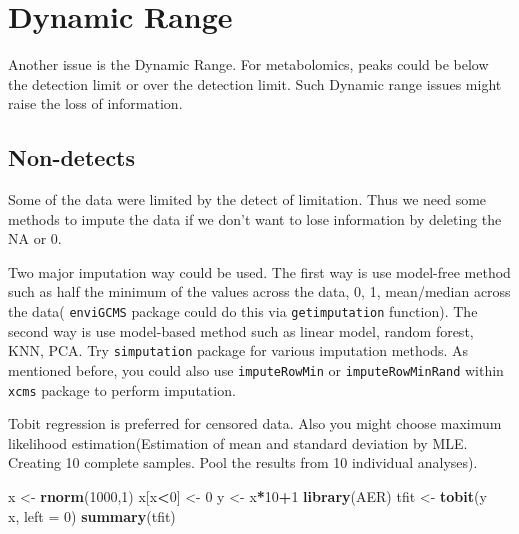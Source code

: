 \documentclass[
]{book}
\newenvironment{Shaded}{\begin{snugshade}}{\end{snugshade}}
\newcommand{\DataTypeTok}[1]{\textcolor[rgb]{0.13,0.29,0.53}{#1}}
\newcommand{\DecValTok}[1]{\textcolor[rgb]{0.00,0.00,0.81}{#1}}
\newcommand{\KeywordTok}[1]{\textcolor[rgb]{0.13,0.29,0.53}{\textbf{#1}}}
\newcommand{\NormalTok}[1]{#1}
\newcommand{\OperatorTok}[1]{\textcolor[rgb]{0.81,0.36,0.00}{\textbf{#1}}}
\newcommand{\StringTok}[1]{\textcolor[rgb]{0.31,0.60,0.02}{#1}}
\begin{document}
\hypertarget{dynamic-range}{%
\section{Dynamic Range}\label{dynamic-range}}

Another issue is the Dynamic Range. For metabolomics, peaks could be below the detection limit or over the detection limit. Such Dynamic range issues might raise the loss of information.

\hypertarget{non-detects}{%
\subsection{Non-detects}\label{non-detects}}

Some of the data were limited by the detect of limitation. Thus we need some methods to impute the data if we don't want to lose information by deleting the NA or 0.

Two major imputation way could be used. The first way is use model-free method such as half the minimum of the values across the data, 0, 1, mean/median across the data( \texttt{enviGCMS} package could do this via \texttt{getimputation} function). The second way is use model-based method such as linear model, random forest, KNN, PCA. Try \texttt{simputation} package for various imputation methods. As mentioned before, you could also use \texttt{imputeRowMin} or \texttt{imputeRowMinRand} within \texttt{xcms} package to perform imputation.

Tobit regression is preferred for censored data. Also you might choose maximum likelihood estimation(Estimation of mean and standard deviation by MLE. Creating 10 complete samples. Pool the results from 10 individual analyses).

\begin{Shaded}
\begin{Highlighting}[]
\NormalTok{x <-}\StringTok{ }\KeywordTok{rnorm}\NormalTok{(}\DecValTok{1000}\NormalTok{,}\DecValTok{1}\NormalTok{)}
\NormalTok{x[x}\OperatorTok{<}\DecValTok{0}\NormalTok{] <-}\StringTok{ }\DecValTok{0}
\NormalTok{y <-}\StringTok{ }\NormalTok{x}\OperatorTok{*}\DecValTok{10}\OperatorTok{+}\DecValTok{1}
\KeywordTok{library}\NormalTok{(AER)}
\NormalTok{tfit <-}\StringTok{ }\KeywordTok{tobit}\NormalTok{(y }\OperatorTok{~}\StringTok{ }\NormalTok{x, }\DataTypeTok{left =} \DecValTok{0}\NormalTok{)}
\KeywordTok{summary}\NormalTok{(tfit)}
\end{Highlighting}
\end{Shaded}
\end{document}
